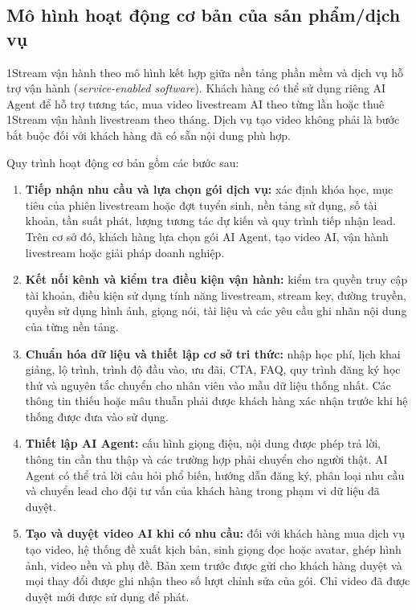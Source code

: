 \subsection{Mô hình hoạt động cơ bản của sản phẩm/dịch vụ}

1Stream vận hành theo mô hình kết hợp giữa nền tảng phần mềm và dịch vụ hỗ trợ
vận hành (\textit{service-enabled software}). Khách hàng có thể sử dụng riêng
AI Agent để hỗ trợ tương tác, mua video livestream AI theo từng lần hoặc thuê
1Stream vận hành livestream theo tháng. Dịch vụ tạo video không phải là bước
bắt buộc đối với khách hàng đã có sẵn nội dung phù hợp.

Quy trình hoạt động cơ bản gồm các bước sau:

\begin{enumerate}
    \item \textbf{Tiếp nhận nhu cầu và lựa chọn gói dịch vụ:} xác định khóa học,
    mục tiêu của phiên livestream hoặc đợt tuyển sinh, nền tảng sử dụng, số tài
    khoản, tần suất phát, lượng tương tác dự kiến và quy trình tiếp nhận lead.
    Trên cơ sở đó, khách hàng lựa chọn gói AI Agent, tạo video AI, vận hành
    livestream hoặc giải pháp doanh nghiệp.

    \item \textbf{Kết nối kênh và kiểm tra điều kiện vận hành:} kiểm tra quyền
    truy cập tài khoản, điều kiện sử dụng tính năng livestream, stream key,
    đường truyền, quyền sử dụng hình ảnh, giọng nói, tài liệu và các yêu cầu
    ghi nhãn nội dung của từng nền tảng.

    \item \textbf{Chuẩn hóa dữ liệu và thiết lập cơ sở tri thức:} nhập học phí,
    lịch khai giảng, lộ trình, trình độ đầu vào, ưu đãi, CTA, FAQ, quy trình
    đăng ký học thử và nguyên tắc chuyển cho nhân viên vào mẫu dữ liệu thống
    nhất. Các thông tin thiếu hoặc mâu thuẫn phải được khách hàng xác nhận
    trước khi hệ thống được đưa vào sử dụng.

    \item \textbf{Thiết lập AI Agent:} cấu hình giọng điệu, nội dung được phép
    trả lời, thông tin cần thu thập và các trường hợp phải chuyển cho người
    thật. AI Agent có thể trả lời câu hỏi phổ biến, hướng dẫn đăng ký, phân
    loại nhu cầu và chuyển lead cho đội tư vấn của khách hàng trong phạm vi
    dữ liệu đã duyệt.

    \item \textbf{Tạo và duyệt video AI khi có nhu cầu:} đối với khách hàng mua
    dịch vụ tạo video, hệ thống đề xuất kịch bản, sinh giọng đọc hoặc avatar,
    ghép hình ảnh, video nền và phụ đề. Bản xem trước được gửi cho khách hàng
    duyệt và mọi thay đổi được ghi nhận theo số lượt chỉnh sửa của gói. Chỉ
    video đã được duyệt mới được sử dụng để phát.


\end{enumerate}
